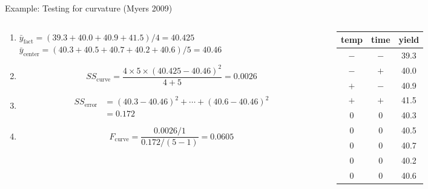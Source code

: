 \documentclass[10pt]{beamer}\usepackage[]{graphicx}\usepackage[]{color}
\newcommand\lo{\ensuremath{\boldsymbol{-}}}
\newcommand\hi{\ensuremath{\boldsymbol{+}}}
\begin{document}
{\small
\begin{frame}{Example: Testing for curvature (Myers 2009)}
\begin{columns}
\begin{column}{0.7\textwidth}
\begin{enumerate}
  \item<2-> $\bar{y}_\text{fact} = (39.3+40.0+40.9+41.5)/4 = 40.425$ \\
    $\bar{y}_\text{center} = (40.3+40.5+40.7+40.2+40.6)/5 = 40.46$
  \item<3-> \[ SS_\text{curve} = \frac{4\times 5\times(40.425 - 40.46)^2}{4+5} = 0.0026 \]
  \item<4-> \begin{align*}
    SS_\text{error} &= (40.3-40.46)^2 + \cdots + (40.6-40.46)^2 \\
                &= 0.172
    \end{align*}
  \item<5-> \[ F_\text{curve} = \frac{0.0026/1}{0.172/(5-1)} = 0.0605 \]
\end{enumerate}
\end{column}
\begin{column}{0.3\textwidth}

\begin{tabular}{ccc}
\toprule
temp & time & yield \\
\midrule
\lo & \lo & 39.3 \\
\lo & \hi & 40.0 \\
\hi & \lo & 40.9 \\
\hi & \hi & 41.5 \\
\midrule
0 & 0 & 40.3 \\
0 & 0 & 40.5 \\
0 & 0 & 40.7 \\
0 & 0 & 40.2 \\
0 & 0 & 40.6 \\
\bottomrule
\end{tabular}

\end{column}
\end{columns}

\bigskip
{}

\end{frame}
} %
\end{document}
